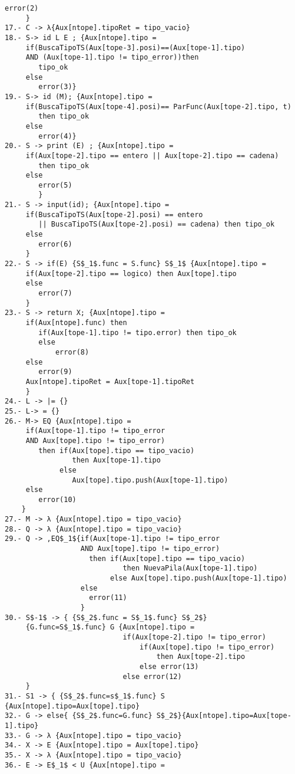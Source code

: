 \documentclass[a4paper, 12pt]{article}
\begin{document}
\begin{lstlisting}[style=EstadosAutomataST]
            error(2)
     }
17.- C -> λ{Aux[ntope].tipoRet = tipo_vacio}
18.- S-> id L E ; {Aux[ntope].tipo =
     if(BuscaTipoTS(Aux[tope-3].posi)==(Aux[tope-1].tipo)
     AND (Aux[tope-1].tipo != tipo_error))then
        tipo_ok
     else
        error(3)}
19.- S-> id (M); {Aux[ntope].tipo =
     if(BuscaTipoTS(Aux[tope-4].posi)== ParFunc(Aux[tope-2].tipo, t)
        then tipo_ok
     else
        error(4)}
20.- S -> print (E) ; {Aux[ntope].tipo =
     if(Aux[tope-2].tipo == entero || Aux[tope-2].tipo == cadena)
        then tipo_ok
     else
        error(5)
        }
21.- S -> input(id); {Aux[ntope].tipo =
     if(BuscaTipoTS(Aux[tope-2].posi) == entero
        || BuscaTipoTS(Aux[tope-2].posi) == cadena) then tipo_ok
     else
        error(6)
     }
22.- S -> if(E) {S$_1$.func = S.func} S$_1$ {Aux[ntope].tipo =
     if(Aux[tope-2].tipo == logico) then Aux[tope].tipo
     else
        error(7)
     }
23.- S -> return X; {Aux[ntope].tipo =
     if(Aux[ntope].func) then
        if(Aux[tope-1].tipo != tipo.error) then tipo_ok
        else
            error(8)
     else
        error(9)
     Aux[ntope].tipoRet = Aux[tope-1].tipoRet
     }
24.- L -> |= {}
25.- L-> = {}
26.- M-> EQ {Aux[ntope].tipo =
     if(Aux[tope-1].tipo != tipo_error
     AND Aux[tope].tipo != tipo_error)
        then if(Aux[tope].tipo == tipo_vacio)
                then Aux[tope-1].tipo
             else
                Aux[tope].tipo.push(Aux[tope-1].tipo)
     else
        error(10)
    }
27.- M -> λ {Aux[ntope].tipo = tipo_vacio}
28.- Q -> λ {Aux[ntope].tipo = tipo_vacio}
29.- Q -> ,EQ$_1${if(Aux[tope-1].tipo != tipo_error
                  AND Aux[tope].tipo != tipo_error)
                    then if(Aux[tope].tipo == tipo_vacio)
                            then NuevaPila(Aux[tope-1].tipo)
                         else Aux[tope].tipo.push(Aux[tope-1].tipo)
                  else
                    error(11)
                  }
30.- S$-1$ -> { {S$_2$.func = S$_1$.func} S$_2$}
     {G.func=S$_1$.func} G {Aux[ntope].tipo =
                            if(Aux[tope-2].tipo != tipo_error)
                                if(Aux[tope].tipo != tipo_error)
                                    then Aux[tope-2].tipo
                                else error(13)
                            else error(12)
     }
31.- S1 -> { {S$_2$.func=s$_1$.func} S {Aux[ntope].tipo=Aux[tope].tipo}
32.- G -> else{ {S$_2$.func=G.func} S$_2$}{Aux[ntope].tipo=Aux[tope-1].tipo}
33.- G -> λ {Aux[ntope].tipo = tipo_vacio}
34.- X -> E {Aux[ntope].tipo = Aux[tope].tipo}
35.- X -> λ {Aux[ntope].tipo = tipo_vacio}
36.- E -> E$_1$ < U {Aux[ntope].tipo =

\end{lstlisting}
\end{document}
